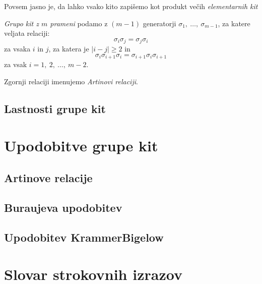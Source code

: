 \documentclass[mat1]{fmfdelo}
\begin{document}
Povsem jasno je, da lahko vsako kito zapišemo kot produkt večih \emph{elementarnih kit}

\begin{definicija}
\emph{Grupo kit z $m$ prameni} podamo z $(m - 1)$ generatorji $\sigma_1,\ \ldots ,\ \sigma_{m - 1}$, za katere veljata relaciji: $$ \sigma_i \sigma_j = \sigma_j \sigma_i $$ za vsaka $i$ in $j$, za katera je $|i - j| \geq 2$ in $$\sigma_i \sigma_{i+1} \sigma_i = \sigma_{i+1} \sigma_i \sigma_{i+1}$$ za vsak $i = 1,\ 2,\ \ldots,\ m-2$.
\end{definicija}

\begin{opomba}
Zgornji relaciji imenujemo \emph{Artinovi relaciji}.
\end{opomba}

\subsection{Lastnosti grupe kit}


\section{Upodobitve grupe kit}

\subsection{Artinove relacije}

\subsection{Buraujeva upodobitev}

\subsection{Upodobitev Krammer\-Bigelow}





\section*{Slovar strokovnih izrazov}

\geslo{}{}


\begin{thebibliography}{99}

\end{thebibliography}
\end{document}
